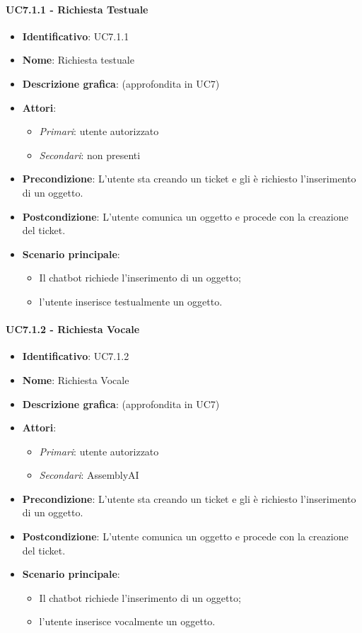 \paragraph{UC7.1.1 - Richiesta Testuale}
\begin{itemize}
   \item \textbf{Identificativo}: UC7.1.1
   \item \textbf{Nome}: Richiesta testuale
   \item \textbf{Descrizione grafica}: (approfondita in UC7)
   \item \textbf{Attori}:
   \begin{itemize} 
       \item \textit{Primari}: utente autorizzato
       \item \textit{Secondari}: non presenti
   \end{itemize}
       \item \textbf{Precondizione}: L'utente sta creando un ticket e gli è richiesto l'inserimento di un oggetto.
       \item \textbf{Postcondizione}: L'utente comunica un oggetto e procede con la creazione del ticket. 
    \item \textbf{Scenario principale}: 
       \begin{itemize}
           \item Il chatbot richiede l'inserimento di un oggetto;
           \item l'utente inserisce testualmente un oggetto.
       \end{itemize}
\end{itemize}

\paragraph{UC7.1.2 - Richiesta Vocale}
\begin{itemize}
   \item \textbf{Identificativo}: UC7.1.2
   \item \textbf{Nome}: Richiesta Vocale
   \item \textbf{Descrizione grafica}: (approfondita in UC7)
   \item \textbf{Attori}:
   \begin{itemize} 
       \item \textit{Primari}: utente autorizzato
       \item \textit{Secondari}: AssemblyAI
   \end{itemize}
       \item \textbf{Precondizione}: L'utente sta creando un ticket e gli è richiesto l'inserimento di un oggetto.
       \item \textbf{Postcondizione}: L'utente comunica un oggetto e procede con la creazione del ticket. 
    \item \textbf{Scenario principale}: 
       \begin{itemize}  
        \item Il chatbot richiede l'inserimento di un oggetto;
        \item l'utente inserisce vocalmente un oggetto.
       \end{itemize}
\end{itemize}


